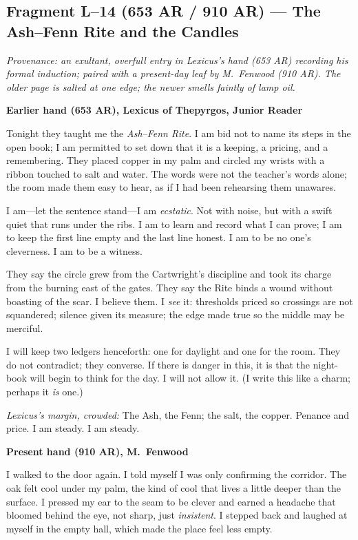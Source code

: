 \documentclass[11pt]{article}
\begin{document}
\subsection{Fragment L--14 (653 AR / 910 AR) --- The Ash--Fenn Rite and the Candles}
\label{frag:l14}
{}

\noindent\textit{Provenance: an exultant, overfull entry in Lexicus’s hand (653 AR) recording his formal induction; paired with a present-day leaf by M.\ Fenwood (910 AR). The older page is salted at one edge; the newer smells faintly of lamp oil.}

\medskip
\noindent\textbf{Earlier hand (653 AR), Lexicus of Thepyrgos, Junior Reader}

Tonight they taught me the \textit{Ash--Fenn Rite}. I am bid not to name its steps in the open book; I am permitted to set down that it is a keeping, a pricing, and a remembering. They placed copper in my palm and circled my wrists with a ribbon touched to salt and water. The words were not the teacher’s words alone; the room made them easy to hear, as if I had been rehearsing them unawares.

I am—let the sentence stand—I am \emph{ecstatic}. Not with noise, but with a swift quiet that runs under the ribs. I am to learn and record what I can prove; I am to keep the first line empty and the last line honest. I am to be no one’s cleverness. I am to be a witness.

They say the circle grew from the Cartwright’s discipline and took its charge from the burning east of the gates. They say the Rite binds a wound without boasting of the scar. I believe them. I \emph{see} it: thresholds priced so crossings are not squandered; silence given its measure; the edge made true so the middle may be merciful.

I will keep two ledgers henceforth: one for daylight and one for the room. They do not contradict; they converse. If there is danger in this, it is that the night-book will begin to think for the day. I will not allow it. (I write this like a charm; perhaps it \emph{is} one.)

\medskip
\noindent\textit{Lexicus’s margin, crowded:} The Ash, the Fenn; the salt, the copper. Penance and price. I am steady. I am steady.

\medskip
\noindent\textbf{Present hand (910 AR), M.\ Fenwood}

I walked to the door again. I told myself I was only confirming the corridor. The oak felt cool under my palm, the kind of cool that lives a little deeper than the surface. I pressed my ear to the seam to be clever and earned a headache that bloomed behind the eye, not sharp, just \emph{insistent}. I stepped back and laughed at myself in the empty hall, which made the place feel less empty.
\end{document}
